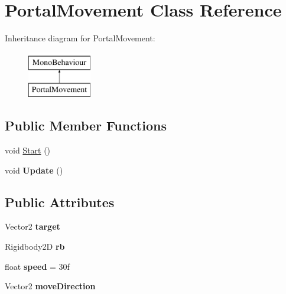 \hypertarget{class_portal_movement}{}\section{Portal\+Movement Class Reference}
\label{class_portal_movement}
Inheritance diagram for Portal\+Movement\+:\begin{figure}[H]
\begin{center}
\leavevmode
\includegraphics[height=2.000000cm]{class_portal_movement}
\end{center}
\end{figure}
\subsection*{Public Member Functions}
\begin{DoxyCompactItemize}
\item 
void \mbox{\hyperlink{class_portal_movement_aa7beca3afea663ec0de74142ac852ca4}{Start}} ()
\item 
\mbox{\label{class_portal_movement_aeb23b9ab7c546f248da82c6e9b6dd473}} 
void {\bfseries Update} ()
\end{DoxyCompactItemize}
\subsection*{Public Attributes}
\begin{DoxyCompactItemize}
\item 
\mbox{\label{class_portal_movement_ae7aedfe2f7fd9d6adfd7bd09ce9d4dac}} 
Vector2 {\bfseries target}
\item 
\mbox{\label{class_portal_movement_a659450b9af54141ec25a5d1d6a4a6f2d}} 
Rigidbody2D {\bfseries rb}
\item 
\mbox{\label{class_portal_movement_a807b6579e694a655749b6088227e0107}} 
float {\bfseries speed} = 30f
\item 
\mbox{\label{class_portal_movement_a00c7141cf734e658d86c3073bea42c78}} 
Vector2 {\bfseries move\+Direction}
\end{DoxyCompactItemize}


